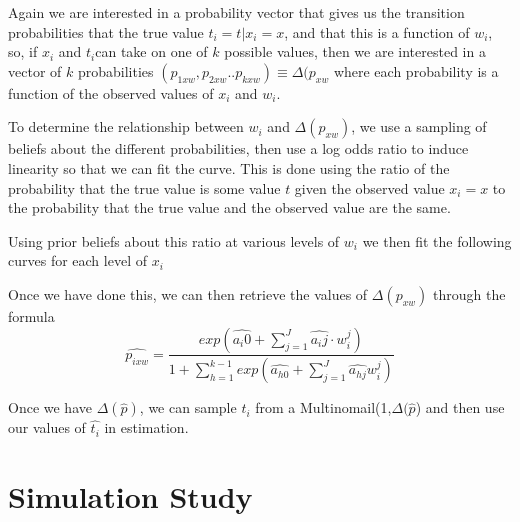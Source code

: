 \documentclass[fignum,letterpaper,12pt]{article}
\begin{document}
Again we are interested in a probability vector that gives us the transition probabilities that the true value $t_{i} = t|x_{i} = x$, and that this is a function of $w_i$, so, if $x_{i}$ and $t_{i}$can take on one of $k$ possible values, then we are interested in a vector of $k$ probabilities $(p_{1xw}, p_{2xw}..p_{kxw}) \equiv \Delta (p_{xw}$ where each probability is a function of the observed values of $x_{i}$ and $w_{i}$. 

To determine the relationship between $w_{i}$ and $\Delta (p_{xw})$, we use a sampling of beliefs about the different probabilities, then use a log odds ratio to induce linearity so that we can fit the curve. This is done using the ratio of the probability that the true value is some value $t$ given the observed value $x_{i} = x$ to the probability that the true value and the observed value are the same. 

Using prior beliefs about this ratio at various levels of $w_{i}$ we then fit the following curves for each level of $x_{i}$


Once we have done this, we can then retrieve the values of $\Delta (p_{xw})$ through the formula
\begin{equation}
\hat{p_{ixw}} = \frac{exp(\hat{a_i0}+\sum_{j=1}^J \hat{a_ij} \cdot w_i^j)}{1+\sum_{h=1}^{k-1}exp(\hat{a_{h0}}+\sum_{j=1}^J \hat{a_{hj}}w_{i}^{j})}
\end{equation}

Once we have $\Delta (\hat{p})$, we can sample $t_{i}$ from a Multinomail(1,$\Delta (\hat{p}$) and then use our values of $\hat{t_{i}}$ in estimation.



\section{Simulation Study} \label{sec:simulation}
\end{document}
